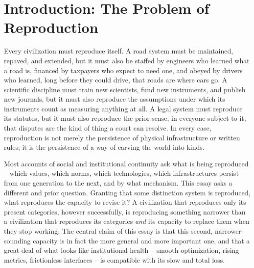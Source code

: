 \documentclass[11pt]{article}
\theoremstyle{plain}
\begin{document}
\newpage
\thispagestyle{plain}

\tableofcontents

\newpage

\section{Introduction: The Problem of Reproduction}
\label{sec:intro}

Every civilization must reproduce itself. A road system must be maintained, repaved, and extended, but it must also be staffed by engineers who learned what a road is, financed by taxpayers who expect to need one, and obeyed by drivers who learned, long before they could drive, that roads are where cars go. A scientific discipline must train new scientists, fund new instruments, and publish new journals, but it must also reproduce the assumptions under which its instruments count as measuring anything at all. A legal system must reproduce its statutes, but it must also reproduce the prior sense, in everyone subject to it, that disputes are the kind of thing a court can resolve. In every case, reproduction is not merely the persistence of physical infrastructure or written rules; it is the persistence of a way of carving the world into kinds.

Most accounts of social and institutional continuity ask what is being reproduced -- which values, which norms, which technologies, which infrastructures persist from one generation to the next, and by what mechanism. This essay asks a different and prior question. Granting that some distinction system is reproduced, what reproduces the capacity to revise it? A civilization that reproduces only its present categories, however successfully, is reproducing something narrower than a civilization that reproduces its categories \emph{and} its capacity to replace them when they stop working. The central claim of this essay is that this second, narrower-sounding capacity is in fact the more general and more important one, and that a great deal of what looks like institutional health -- smooth optimization, rising metrics, frictionless interfaces -- is compatible with its slow and total loss.
\end{document}
